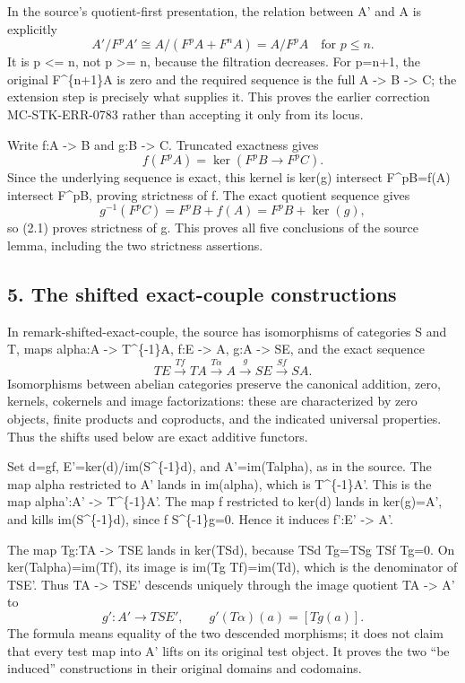 In the source's quotient-first presentation, the relation between A' and A is explicitly \[
A'/F^pA'
 \cong A/(F^pA+F^nA)=A/F^pA\quad\text{for }p\le n.        \tag{4.1}
\] It is p \textless= n, not p \textgreater= n, because the filtration decreases. For p=n+1, the original F\^{}\{n+1\}A is zero and the required sequence is the full A -\textgreater{} B -\textgreater{} C; the extension step is precisely what supplies it. This proves the earlier correction MC-STK-ERR-0783 rather than accepting it only from its locus.

Write f:A -\textgreater{} B and g:B -\textgreater{} C. Truncated exactness gives \[
f(F^pA)=\ker(F^pB\longrightarrow F^pC).
\] Since the underlying sequence is exact, this kernel is ker(g) intersect F\^{}pB=f(A) intersect F\^{}pB, proving strictness of f. The exact quotient sequence gives \[
g^{-1}(F^pC)=F^pB+f(A)=F^pB+\ker(g),
\] so (2.1) proves strictness of g. This proves all five conclusions of the source lemma, including the two strictness assertions.

\subsection{5. The shifted exact-couple constructions}\label{note-05-the-shifted-exact-couple-constructions}

In remark-shifted-exact-couple, the source has isomorphisms of categories S and T, maps alpha:A -\textgreater{} T\^{}\{-1\}A, f:E -\textgreater{} A, g:A -\textgreater{} SE, and the exact sequence \[
TE\xrightarrow{Tf}TA\xrightarrow{T\alpha}A
\xrightarrow{g}SE\xrightarrow{Sf}SA.
\] Isomorphisms between abelian categories preserve the canonical addition, zero, kernels, cokernels and image factorizations: these are characterized by zero objects, finite products and coproducts, and the indicated universal properties. Thus the shifts used below are exact additive functors.

Set d=gf, E'=ker(d)/im(S\^{}\{-1\}d), and A'=im(Talpha), as in the source. The map alpha restricted to A' lands in im(alpha), which is T\^{}\{-1\}A'. This is the map alpha':A' -\textgreater{} T\^{}\{-1\}A'. The map f restricted to ker(d) lands in ker(g)=A', and kills im(S\^{}\{-1\}d), since f S\^{}\{-1\}g=0. Hence it induces f':E' -\textgreater{} A'.

The map Tg:TA -\textgreater{} TSE lands in ker(TSd), because TSd Tg=TSg TSf Tg=0. On ker(Talpha)=im(Tf), its image is im(Tg Tf)=im(Td), which is the denominator of TSE'. Thus TA -\textgreater{} TSE' descends uniquely through the image quotient TA -\textgreater{} A' to \[
g':A'\longrightarrow TSE',\qquad
g'(T\alpha)(a)=[Tg(a)].                                  \tag{5.1}
\] The formula means equality of the two descended morphisms; it does not claim that every test map into A' lifts on its original test object. It proves the two ``be induced'' constructions in their original domains and codomains.

